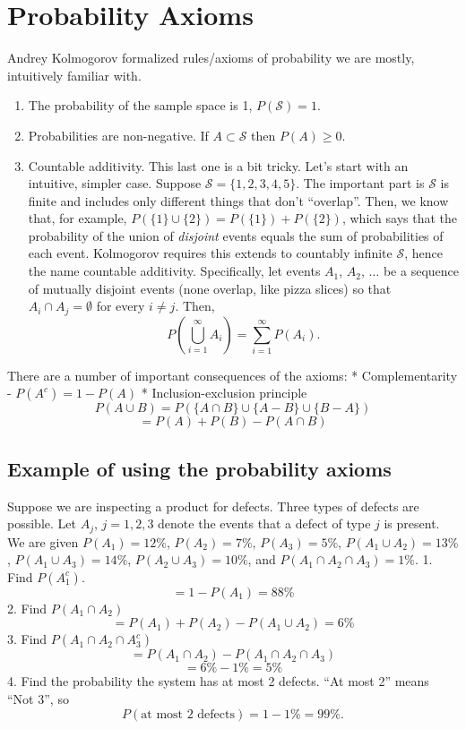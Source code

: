 \documentclass[
]{book}
\providecommand{\tightlist}{%
  \setlength{\itemsep}{0pt}\setlength{\parskip}{0pt}}
\begin{document}
\hypertarget{probability-axioms}{%
\section{Probability Axioms}\label{probability-axioms}}

Andrey Kolmogorov formalized rules/axioms of probability we are mostly, intuitively familiar with.

\begin{enumerate}
\def\labelenumi{\arabic{enumi}.}
\tightlist
\item
  The probability of the sample space is 1, \(P(\mathcal{S})=1\).
\item
  Probabilities are non-negative. If \(A\subset\mathcal{S}\) then \(P(A)\geq 0\).
\item
  Countable additivity. This last one is a bit tricky. Let's start with an intuitive, simpler case. Suppose \(\mathcal{S} = \{1,2,3,4,5\}\). The important part is \(\mathcal{S}\) is finite and includes only different things that don't ``overlap''. Then, we know that, for example, \(P(\{1\}\cup \{2\}) = P(\{1\}) + P(\{2\})\), which says that the probability of the union of \emph{disjoint} events equals the sum of probabilities of each event. Kolmogorov requires this extends to countably infinite \(\mathcal{S}\), hence the name countable additivity. Specifically, let events \(A_1\), \(A_2\), \(\ldots\) be a sequence of mutually disjoint events (none overlap, like pizza slices) so that \(A_i \cap A_j = \emptyset\) for every \(i\ne j\). Then,
  \[P\left(\bigcup_{i=1}^\infty A_i\right) = \sum_{i=1}^\infty P(A_i).\]
\end{enumerate}

There are a number of important consequences of the axioms:
* Complementarity - \(P(A^c) = 1-P(A)\)
* Inclusion-exclusion principle
\[P(A\cup B) = P(\{A\cap B\}\cup\{A-B\}\cup\{B-A\})\]
\[ = P(A)+P(B)-P(A\cap B)\]

\hypertarget{example-of-using-the-probability-axioms}{%
\subsection{Example of using the probability axioms}\label{example-of-using-the-probability-axioms}}

Suppose we are inspecting a product for defects. Three types of defects are possible. Let \(A_j\), \(j=1, 2, 3\) denote the events that a defect of type \(j\) is present. We are given \(P(A_1) = 12\%\), \(P(A_2) = 7\%\), \(P(A_3) = 5\%\), \(P(A_1\cup A_2) = 13\%\), \(P(A_1 \cup A_3) = 14\%\), \(P(A_2 \cup A_3) = 10\%\), and \(P(A_1\cap A_2\cap A_3) = 1\%\).
1. Find \(P(A_1^c)\).
\[ = 1-P(A_1) = 88\%\]
2. Find \(P(A_1\cap A_2)\)
\[ = P(A_1) + P(A_2) - P(A_1\cup A_2) = 6\%\]
3. Find \(P(A_1 \cap A_2 \cap A_3^c)\)
\[ = P(A_1\cap A_2) - P(A_1\cap A_2 \cap A_3)\]
\[ = 6\% - 1\% = 5\%\]
4. Find the probability the system has at most 2 defects.
``At most 2'' means ``Not 3'', so
\[P(\text{at most 2 defects}) = 1 - 1\% = 99\%.\]
\end{document}
